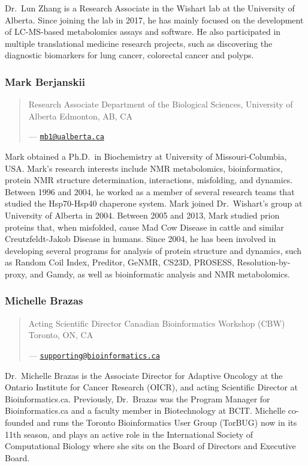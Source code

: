 \documentclass[
]{book}
\begin{document}
Dr.~Lun Zhang is a Research Associate in the Wishart lab at the
University of Alberta. Since joining the lab in 2017, he has mainly
focused on the development of LC-MS-based metabolomics
assays and software. He also participated in multiple translational
medicine research projects, such as discovering the diagnostic biomarkers for lung cancer,
colorectal cancer and polyps.

\subsubsection{Mark Berjanskii}\label{mark-berjanskii}

\begin{quote}
Research Associate
Department of the Biological Sciences, University of Alberta
Edmonton, AB, CA

--- \href{mailto:mb1@ualberta.ca}{\nolinkurl{mb1@ualberta.ca}}
\end{quote}

Mark obtained a Ph.D.~in Biochemistry at University of
Missouri-Columbia, USA. Mark's research interests include NMR
metabolomics, bioinformatics, protein NMR structure determination,
interactions, misfolding, and dynamics. Between 1996 and 2004, he
worked as a member of several research teams that studied the Hsp70-Hsp40 chaperone
system. Mark joined Dr.~Wishart's group at University of Alberta in 2004. Between 2005 and
2013, Mark studied prion proteins that, when misfolded, cause Mad Cow Disease in cattle and
similar Creutzfeldt-Jakob Disease in humans. Since 2004, he has been involved in developing
several programs for analysis of protein structure and dynamics, such as Random Coil Index,
Preditor, GeNMR, CS23D, PROSESS, Resolution-by-proxy, and Gamdy, as well as
bioinformatic analysis and NMR metabolomics.

\subsubsection{Michelle Brazas}\label{michelle-brazas}

\begin{quote}
Acting Scientific Director
Canadian Bioinformatics Workshop (CBW)
Toronto, ON, CA

--- \href{mailto:supporting@bioinformatics.ca}{\nolinkurl{supporting@bioinformatics.ca}}
\end{quote}

Dr.~Michelle Brazas is the Associate Director for Adaptive Oncology at
the Ontario Institute for Cancer Research (OICR), and acting Scientific
Director at Bioinformatics.ca. Previously, Dr.~Brazas was the Program Manager for
Bioinformatics.ca and a faculty member in Biotechnology at BCIT. Michelle co-founded and runs
the Toronto Bioinformatics User Group (TorBUG) now in its 11th season, and plays an active
role in the International Society of Computational Biology where she sits on the Board of
Directors and Executive Board.
\end{document}

